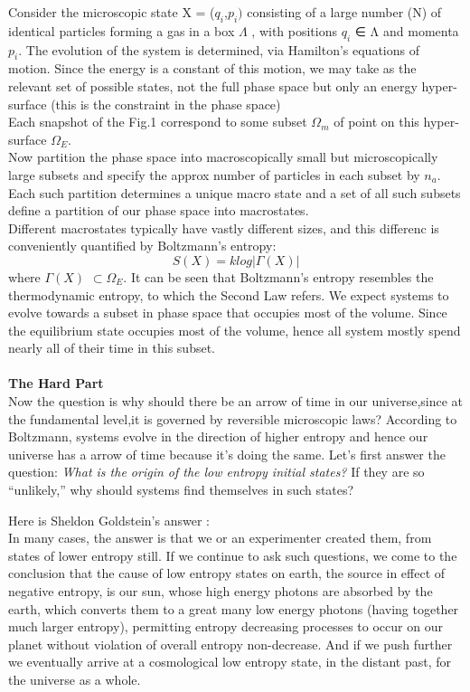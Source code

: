 \documentclass[11pt]{article}
\begin{document}
Consider the microscopic state X = ($q_{i}$,$p_{i})$ consisting of a large number (N) of identical particles forming a gas in a box $\Lambda$ , with positions $q_i$ ∈ Λ and momenta $p_i$. The evolution of the system is determined, via Hamilton's equations of motion. Since the energy is a constant of this motion, we may take as the relevant set of possible states, not the full phase space but only an energy hyper-surface (this is the constraint in the phase space)\\
Each snapshot of the Fig.1 correspond to some subset $\Omega_{m}$ of point on this hyper-surface $\Omega_{E}$.\\
Now partition the phase space into macroscopically small but microscopically large subsets and specify the approx number of particles in each subset by $n_a$. Each such partition determines a unique macro state and a set of all such subsets define a partition of our phase space into macrostates.\\


Different macrostates typically have vastly different sizes, and this differenc is conveniently quantified by Boltzmann’s entropy: $$S(X) = klog|\Gamma (X)|$$
where  $\Gamma(X)$ $\subset \Omega_{E} $. It can be seen that Boltzmann’s entropy
resembles the thermodynamic entropy, to which the Second Law refers. We expect systems to evolve towards a subset in phase space that occupies most of the volume. Since the equilibrium state occupies most of the volume, hence all system mostly spend nearly all of their time in this subset.\\ \\

\textbf{The Hard Part}\\

Now the question is why should there be an arrow of time in our universe,since at the fundamental level,it is governed by reversible microscopic laws? According to Boltzmann, systems evolve in the direction of higher entropy and hence our universe has a arrow of time because it's doing the same. Let's first answer the question: \textit{What is the origin of the low entropy initial states?} If they are so “unlikely,” why should systems find themselves in such states?

Here is Sheldon Goldstein's answer \cite{S}:\\
In many cases, the answer is that we or an experimenter created them, from states of lower entropy still. If we continue to ask such questions, we come to the conclusion that the cause of low entropy states on earth, the source in effect of negative entropy, is our sun, whose high energy photons are absorbed by the earth, which converts them to a great many
low energy photons (having together much larger entropy), permitting entropy decreasing
processes to occur on our planet without violation of overall entropy non-decrease. And if we push further we eventually arrive at a cosmological low entropy state, in the distant past, for the universe as a whole. \\
\end{document}
